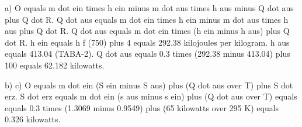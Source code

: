 a)  
O equals m dot ein times h ein minus m dot aus times h aus minus Q dot aus plus Q dot R.  
Q dot aus equals m dot ein times h ein minus m dot aus times h aus plus Q dot R.  
Q dot aus equals m dot ein times (h ein minus h aus) plus Q dot R.  
h ein equals h f (750) plus 4 equals 292.38 kilojoules per kilogram.  
h aus equals 413.04 (TABA-2).  
Q dot aus equals 0.3 times (292.38 minus 413.04) plus 100 equals 62.182 kilowatts.

b)  
c)  
O equals m dot ein (S ein minus S aus) plus (Q dot aus over T) plus S dot erz.  
S dot erz equals m dot ein (s aus minus s ein) plus (Q dot aus over T) equals  
equals 0.3 times (1.3069 minus 0.9549) plus (65 kilowatts over 295 K) equals 0.326 kilowatts.